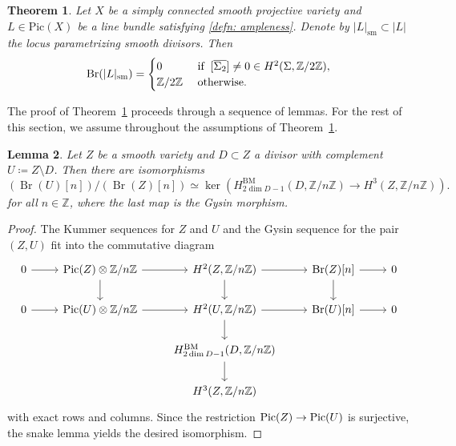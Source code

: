 \documentclass[11pt]{amsart}
\theoremstyle{plain}
\newtheorem{thm}{Theorem}[section]
\newtheorem{lem}[thm]{Lemma}
\theoremstyle{definition}
\theoremstyle{remark}
\DeclareMathOperator{\Br}{Br}
\newcommand{\Pic}{\mathop{\rm Pic}\nolimits}
\begin{document}
\begin{thm}\label{thm:brauer_base}
    Let $X$ be a simply connected smooth projective variety and $L\in \mathrm{Pic}(X)$ be a line bundle satisfying \ref{defn: ampleness}. Denote by $|L|_\mathrm{sm}\subset |L|$ the locus parametrizing smooth divisors. Then 
    \[\mathrm{Br}(|L|_\mathrm{sm}) = \begin{cases}0 & \text{  if \:} [\overline{\Sigma_{2}}] \neq 0 \in H^2(\Sigma, \mathbb Z / 2 \mathbb Z),\\ \mathbb Z / 2\mathbb Z & \text{  otherwise}.\end{cases}\]

\end{thm}

 The proof of Theorem~\ref{thm:brauer_base} proceeds through a sequence of lemmas. For the rest of this section, we assume throughout the assumptions of Theorem~\ref{thm:brauer_base}. 


\begin{lem}\label{lem:brauer_bm}
 Let $Z$ be a smooth variety and $D \subset Z$ a divisor with complement $U \coloneq Z \setminus D$. Then there are isomorphisms
 $$(\Br(U)[n])/(\Br(Z)[n]) \simeq \ker(H^{\mathrm{BM}}_{2\dim D-1}(D, \mathbb Z / n \mathbb Z) \to H^3(Z, \mathbb Z / n \mathbb Z)).$$
 for all $n \in \mathbb Z$, where the last map is the Gysin morphism.
 \end{lem}
\begin{proof}
The Kummer sequences for $Z$ and $U$ and the Gysin sequence for the pair $(Z, U)$ fit into the commutative diagram
    $$
    \begin{tikzcd}
0 \arrow[r] & \Pic(Z)\otimes \mathbb Z / n \mathbb Z \arrow[r] \arrow[d] & {H^2(Z, \mathbb Z / n \mathbb Z)} \arrow[d]   \arrow[r]                     & {\Br(Z)[n]} \arrow[r] \arrow[d] & 0 \\
0 \arrow[r] & \Pic(U)\otimes \mathbb Z / n \mathbb Z \arrow[r] & {H^2(U, \mathbb Z / n \mathbb Z)} \arrow[r] \arrow[d]              & {\Br(U)[n]} \arrow[r]           & 0 \\
            &                                               & {H_{2\dim D-1}^{\mathrm{BM}}(D, \mathbb Z /n \mathbb Z)} \arrow[d] &                                 &   \\
            &                                                            & {H^3(Z, \mathbb Z /n \mathbb Z)}                                   &                                 &  
\end{tikzcd}
    $$
    with exact rows and columns. Since the restriction $\Pic(Z) \to \Pic(U)$ is surjective, the snake lemma yields the desired isomorphism.
\end{proof}
\end{document}

